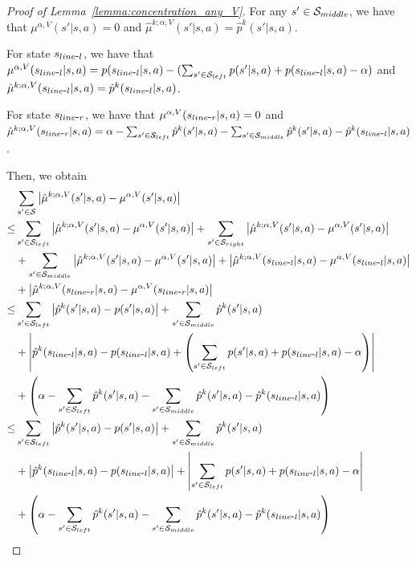 \begin{proof}[Proof of Lemma~\ref{lemma:concentration_any_V}]
	For any $s' \in \mathcal{S}_{middle}$, we have that $\mu^{\alpha,V}(s'|s,a)=0$ and $\hat{\mu}^{k;\alpha,V}(s'|s,a)=\hat{p}^{k}(s'|s,a)$.
	
	For state $s_{line \mbox{-} l}$, we have that 
	$\mu^{\alpha,V}(s_{line \mbox{-} l}|s,a)=p(s_{line \mbox{-} l}|s,a)-(\sum_{s' \in \mathcal{S}_{left}} p(s'|s,a) + p(s_{line \mbox{-} l}|s,a) - \alpha )$ and $\hat{\mu}^{k;\alpha,V}(s_{line \mbox{-} l}|s,a)=\hat{p}^{k}(s_{line \mbox{-} l}|s,a)$.
	
	For state $s_{line \mbox{-} r}$, we have that $\mu^{\alpha,V}(s_{line \mbox{-} r}|s,a)=0$ and $\hat{\mu}^{k;\alpha,V}(s_{line \mbox{-} r}|s,a)=\alpha-\sum_{s' \in \mathcal{S}_{left}} \hat{p}^{k}(s'|s,a) - \sum_{s' \in \mathcal{S}_{middle}} \hat{p}^{k}(s'|s,a) - \hat{p}^{k}(s_{line \mbox{-} l}|s,a)$.
	
	Then, we obtain
	\begin{align}
		& \sum_{s' \in \cS} \abr{\hat{\mu}^{k;\alpha,V}(s'|s,a)-\mu^{\alpha,V}(s'|s,a)}
		\nonumber\\
		\leq & \sum_{s' \in \cS_{left}} \abr{\hat{\mu}^{k;\alpha,V}(s'|s,a)-\mu^{\alpha,V}(s'|s,a)} + \sum_{s' \in \cS_{right}} \abr{\hat{\mu}^{k;\alpha,V}(s'|s,a)-\mu^{\alpha,V}(s'|s,a)} \nonumber\\& + \sum_{s' \in \cS_{middle}} \abr{\hat{\mu}^{k;\alpha,V}(s'|s,a)-\mu^{\alpha,V}(s'|s,a)} + \abr{\hat{\mu}^{k;\alpha,V}(s_{line \hyphen l}|s,a)-\mu^{\alpha,V}(s_{line \hyphen l}|s,a)} \nonumber\\& + \abr{\hat{\mu}^{k;\alpha,V}(s_{line \hyphen r}|s,a)-\mu^{\alpha,V}(s_{line \hyphen r}|s,a)}
		\nonumber\\
		\leq & \sum_{s' \in \cS_{left}} \abr{\hat{p}^k(s'|s,a)-p(s'|s,a)} + \sum_{s' \in \cS_{middle}} \hat{p}^{k}(s'|s,a) \nonumber\\& + \abr{\hat{p}^{k}(s_{line \hyphen l}|s,a) - p(s_{line \hyphen l}|s,a) + \sbr{\sum_{s' \in \cS_{left}} p(s'|s,a) + p(s_{line \hyphen l}|s,a) - \alpha} } \nonumber\\& + \sbr{\alpha-\sum_{s' \in \cS_{left}} \hat{p}^{k}(s'|s,a) - \sum_{s' \in \cS_{middle}} \hat{p}^{k}(s'|s,a) - \hat{p}^{k}(s_{line \hyphen l}|s,a)}
		\nonumber\\
		\leq & \sum_{s' \in \cS_{left}} \abr{\hat{p}^k(s'|s,a)-p(s'|s,a)} + \sum_{s' \in \cS_{middle}} \hat{p}^{k}(s'|s,a) \nonumber\\& + \abr{\hat{p}^{k}(s_{line \hyphen l}|s,a) - p(s_{line \hyphen l}|s,a)} + \abr{\sum_{s' \in \cS_{left}} p(s'|s,a) + p(s_{line \hyphen l}|s,a) - \alpha} \nonumber\\& + \sbr{\alpha-\sum_{s' \in \cS_{left}} \hat{p}^{k}(s'|s,a) - \sum_{s' \in \cS_{middle}} \hat{p}^{k}(s'|s,a) - \hat{p}^{k}(s_{line \hyphen l}|s,a)}

\end{align}
\end{proof}
